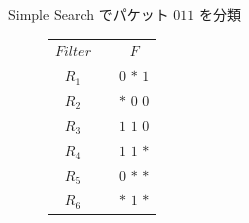 \documentclass[12pt,dvipdfmx,mathserif,uplatex,aspectratio=32]{beamer}
\makeatletter
\newcommand{\tblcaption}[1]{\def\@captype{table}\caption{#1}}
\makeatother
\begin{document}
\begin{frame}{Simple Search でパケット $011$ を分類}

\begin{figure}[h]
\begin{center}
 \def\@captype{table}
 \begin{minipage}[t]{.48\textwidth}
  \begin{center}
  \begin{tabular}{ccc}
        & &    \\ \hline
 $Filter $& & $F$ \\ \hline
 $R_{1}$ & & $0$ $*$ $1$ \\ 
 $R_{2}$ & & $*$ $0$ $0$ \\ 
 $R_{3}$ & & $1$ $1$ $0$ \\ 
 $R_{4}$ & & $1$ $1$ $*$ \\ 
 $R_{5}$ & & $0$ $*$ $*$ \\ 
 {\color{red} $R_{6}$} & & $*$ {\color{red} $1$} $*$ \\ \hline
  \end{tabular}
  \end{center}
 \end{minipage}
 \hfill
 \begin{minipage}[c]{.40\textwidth}
 \scalebox{0.7}{}
 \end{minipage}
\end{center}
\end{figure}

\vspace{10mm}

\end{frame}
\end{document}
